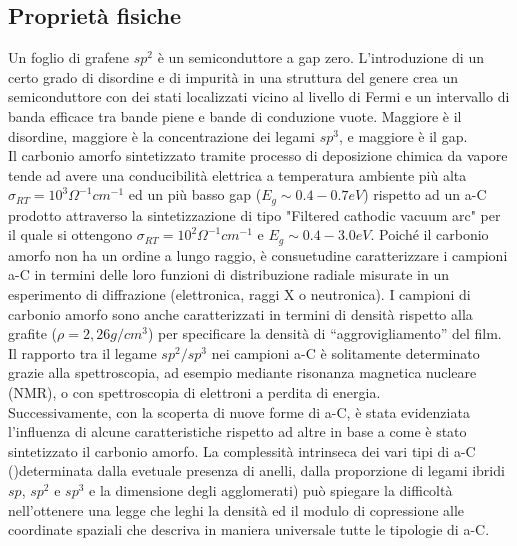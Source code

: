 \documentclass[a4paper,titlepage]{book}
\begin{document}
\subsection{Proprietà fisiche}
Un foglio di grafene $sp^2$ è un semiconduttore a gap zero. L'introduzione di un certo grado di disordine e di impurità in una struttura del genere crea un semiconduttore con dei stati localizzati vicino al livello di Fermi e un intervallo di banda efficace tra bande piene e bande di conduzione vuote. Maggiore è il disordine, maggiore è la concentrazione dei legami $sp^3$, e maggiore è il gap. \\
Il carbonio amorfo sintetizzato tramite processo di deposizione chimica da vapore tende ad avere una conducibilità elettrica a temperatura ambiente più alta $\sigma_{RT}=10^3 \Omega^{-1}cm^{-1}$ ed un più basso gap ($E_g \sim0.4-0.7 eV$) rispetto  ad un a-C prodotto attraverso la sintetizzazione di tipo "Filtered cathodic vacuum arc" per il quale si ottengono $\sigma_{RT}=10^2 \Omega^{-1}cm^{-1}$ e $E_g \sim 0.4- 3.0eV$.
Poiché il carbonio amorfo non ha un ordine a lungo raggio, è consuetudine caratterizzare i campioni a-C in termini delle loro funzioni di distribuzione radiale misurate in un esperimento di diffrazione (elettronica, raggi X o neutronica). I campioni di carbonio amorfo sono anche caratterizzati in termini di densità rispetto alla grafite ($\rho= 2,26 g / cm^3$) per specificare la densità di “aggrovigliamento” del film. Il rapporto tra il legame $sp^2 / sp^3$ nei campioni a-C è solitamente determinato grazie alla spettroscopia, ad esempio mediante risonanza magnetica nucleare (NMR), o con spettroscopia di elettroni a perdita di energia.\\
Successivamente, con la scoperta di nuove forme di a-C, è stata evidenziata l'influenza di alcune caratteristiche rispetto ad altre in base a come è stato sintetizzato il carbonio amorfo. La complessità intrinseca dei vari tipi di a-C ()determinata dalla evetuale presenza di anelli, dalla proporzione di legami ibridi $sp$, $sp^2$ e $sp^3$ e la dimensione degli agglomerati) può spiegare la difficoltà nell'ottenere una legge che leghi la densità ed il modulo di copressione alle coordinate spaziali che descriva in maniera universale tutte le tipologie di a-C.
\end{document}
